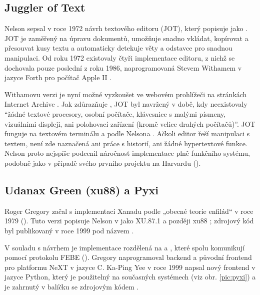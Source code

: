 \subsection{Juggler of Text}
\label{sec:impl:jot}

Nelson sepsal v roce 1972 návrh textového editoru  (JOT), který popisuje jako . JOT je zaměřený na úpravu dokumentů, umožňuje snadno vkládat, kopírovat a přesouvat kusy textu a automaticky detekuje věty a odstavce pro snadnou manipulaci. Od roku 1972 existovaly čtyři implementace editoru, z nichž se dochovala pouze poslední z roku 1986, naprogramovaná Stevem Withamem v jazyce Forth pro počítač Apple II \autocite{JOTinstrux17-D6}.

Withamovu verzi je nyní možné vyzkoušet ve webovém prohlížeči na stránkách Internet Archive \autocite{JOT}.
Jak zdůrazňuje \textcite{JOTinstrux17-D6}, JOT byl navržený v době, kdy neexistovaly \enquote{žádné textové procesory, osobní počítače, klávesnice s malými písmeny, vizuálními displeji, ani polohovací zařízení (kromě velice drahých počítačů)}.
JOT funguje na textovém terminálu a podle Nelsona . Ačkoli editor řeší manipulaci s textem, není zde naznačená ani práce s historií, ani žádné hypertextové funkce. Nelson proto nejspíše podcenil náročnost implementace plně funkčního systému, podobně jako v případě svého prvního projektu na Harvardu ().

\subsection{Udanax Green (xu88) a Pyxi}
\label{sec:impl:green}

Roger Gregory začal s implementací Xanadu podle „obecné teorie enfilád“ v roce 1979 (). Tuto verzi popisuje Nelson v  \autocite*{LitMachines} jako XU.87.1 a později xu88 \autocite{Nelson1999b}; zdrojový kód byl publikovaný v roce 1999 pod názvem  \autocite{Udanax:Green}.

V souladu s návrhem je implementace rozdělená na  a , které spolu komunikují pomocí protokolu FEBE (). Gregory naprogramoval backend a původní frontend pro platformu NeXT v jazyce C. Ka-Ping Yee v roce 1999 napsal nový frontend v jazyce Python, který je použitelný na současných systémech (viz obr. \ref{pic:pyxi}) a je zahrnutý v balíčku se zdrojovým kódem \autocite{Udanax:Green}.

